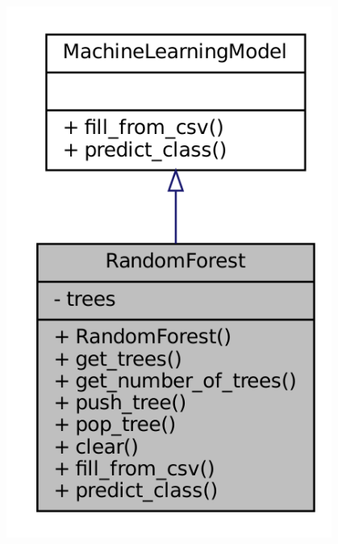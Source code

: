 \documentclass[10pt]{article}
\begin{document}
\begin{minipage}[t]{0.4\linewidth}
\centering
\vspace{-2ex}
\includegraphics[width=0.8\textwidth]{RandomForestDiagram.png}

\end{minipage}
\end{document}
